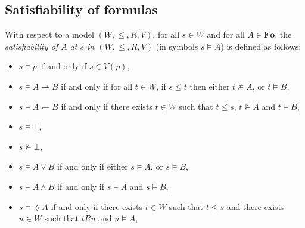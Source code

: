 \documentclass[draft]{article}
\def\Fo{\mathbf{Fo}}
\begin{document}
\subsection{Satisfiability of formulas}
%
%
With respect to a model $(W,{\leq},{R},V)$, for all $s{\in}W$ and for all $A{\in}\Fo$, the {\em satisfiability of $A$ at $s$ in $(W,{\leq},{R},V)$}\/ (in symbols $s{\models}A$) is defined as follows:
%
%
\begin{itemize}
%
%
\item $s{\models}p$ if and only if $s{\in}V(p)$,
%
%
%
%
\item $s{\models}A{\rightharpoonup}B$ if and only if for all $t{\in}W$, if $s{\leq}t$ then either $t{\not\models}A$, or $t{\models}B$,
%
%
%
%
\item $s{\models}A{\leftharpoondown}B$ if and only if there exists $t{\in}W$ such that $t{\leq}s$, $t{\not\models}A$ and $t{\models}B$,
%
%
%
%
\item $s{\models}{\top}$,
%
%
%
%
\item $s{\not\models}{\bot}$,
%
%
%
%
\item $s{\models}A{\vee}B$ if and only if either $s{\models}A$, or $s{\models}B$,
%
%
%
%
\item $s{\models}A{\wedge}B$ if and only if $s{\models}A$ and $s{\models}B$,
%
%
%
%
\item $s{\models}{\lozenge}A$ if and only if there exists $t{\in}W$ such that $t{\leq}s$ and there exists $u{\in}W$ such that $t{R}u$ and $u{\models}A$,

\end{itemize}
\end{document}
